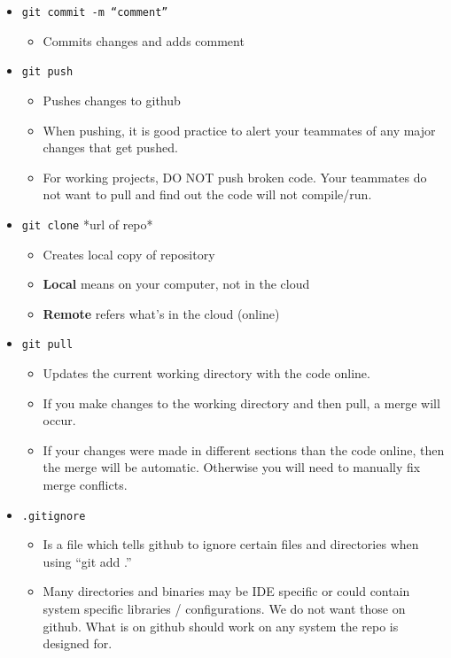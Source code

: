 \documentclass[12pt, letterpaper]{article}
\begin{document}
\begin{itemize}
\begin{itemize}
	\end{itemize}
	\item \texttt{git commit -m “comment”}
	\begin{itemize}
		\item Commits changes and adds comment
	\end{itemize}
	\item \texttt{git push}
	\begin{itemize}
		\item Pushes changes to github
		\item When pushing, it is good practice to alert your teammates of any major changes that get pushed.
		\item For working projects, DO NOT push broken code. Your teammates do not want to pull and find out the code will not compile/run. 
	\end{itemize}
	\item \texttt{git clone} *url of repo*
		\begin{itemize}
			\item Creates local copy of repository 
			\item \textbf{Local} means on your computer, not in the cloud
			\item \textbf{Remote} refers what’s in the cloud (online)
		\end{itemize}
	\item \texttt{git pull}
		\begin{itemize}
			\item Updates the current working directory with the code online.
			\item If you make changes to the working directory and then pull, a merge will occur.
			\item If your changes were made in different sections than the code online, then the merge will be automatic. Otherwise you will need to manually fix merge conflicts. 
			\end{itemize} 
			\item \texttt{.gitignore}
			\begin{itemize}
				\item Is a file which tells github to ignore certain files and directories when using “git add .”
				\item Many directories and binaries may be IDE specific or could contain system specific libraries / configurations. We do not want those on github. What is on github should work on any system the repo is designed for.
			\end{itemize}
\end{itemize}
\end{document}
